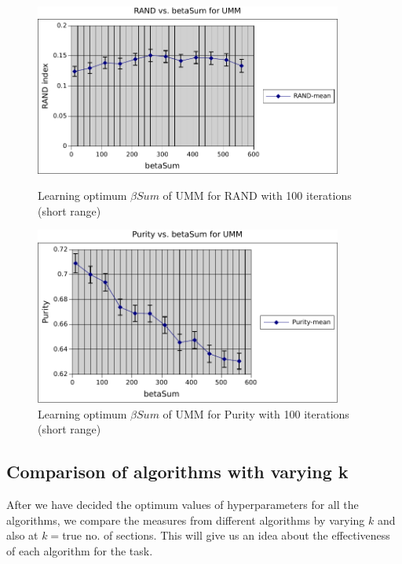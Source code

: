 \begin{figure}
    \centering
    \begin{minipage}{0.45\textwidth}
        \centering
        \includegraphics[width=0.9\textwidth]{fig/betaSum_rand_umm2.pdf}
        \caption{Learning optimum $\beta Sum$ of UMM for RAND with 100 iterations (short range)}
    \end{minipage}\hfill
    \begin{minipage}{0.45\textwidth}
        \centering
        \includegraphics[width=0.9\textwidth]{fig/betaSum_purity_umm2.pdf}
        \caption{Learning optimum $\beta Sum$ of UMM for Purity with 100 iterations (short range)}
    \end{minipage}
\end{figure}

\subsection{Comparison of algorithms with varying k} After we have decided the optimum values of hyperparameters for all the algorithms, we compare the measures from different algorithms by varying $k$ and also at $k = $true no. of sections. This will give us an idea about the effectiveness of each algorithm for the task.

